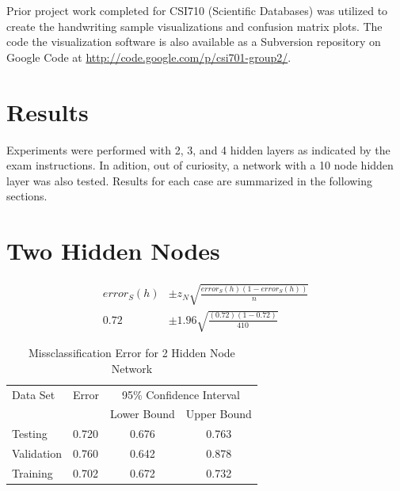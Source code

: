 \documentclass{article}
\begin{document}
Prior project work completed for CSI710 (Scientific Databases) was utilized to create the handwriting sample visualizations and confusion matrix plots. The code the visualization software is also available as a Subversion repository on Google Code at \url{http://code.google.com/p/csi701-group2/}.

\section{Results}\label{Results}

Experiments were performed with 2, 3, and 4 hidden layers as indicated by the exam instructions. In adition, out of curiosity, a network with a 10 node hidden layer was also tested. Results for each case are summarized in the following sections.

\section{Two Hidden Nodes}\label{hidden2}



\begin{equation}\label{conf2sample}
\begin{split}
error_{S}(h) &\pm z_{N}\sqrt{\frac{error_{S}(h)(1-error_{S}(h))}{n}} \\
0.72 &\pm 1.96\sqrt{\frac{(0.72)(1-0.72)}{410}} 
\end{split}
\end{equation}

\begin{table}
\caption{Missclassification Error for 2 Hidden Node Network}
\begin{center}
\begin{tabular}{llcc}
\toprule
Data Set & Error & \multicolumn{2}{c}{95\% Confidence Interval} \\
\cmidrule(r){3-4}
& & Lower Bound & Upper Bound \\
\midrule
Testing       & 0.720 &  0.676 & 0.763  \\
Validation    & 0.760 &  0.642 & 0.878  \\
Training      & 0.702 &  0.672 & 0.732  \\
\bottomrule
\end{tabular}
\label{table2}
\end{center}
\end{table}
\end{document}
